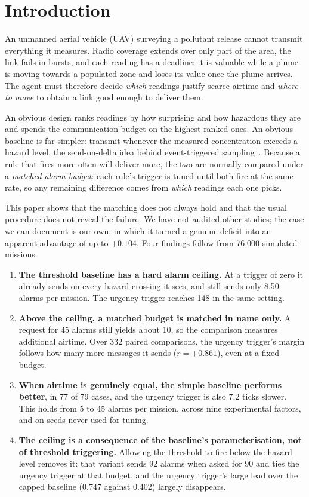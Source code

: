 \documentclass[pdflatex,sn-mathphys-num,iicol]{sn-jnl}
\theoremstyle{thmstyleone}
\theoremstyle{thmstyletwo}
\theoremstyle{thmstylethree}
\begin{document}
\section{Introduction}\label{sec:intro}

An unmanned aerial vehicle (UAV) surveying a pollutant release cannot transmit everything
it measures. Radio coverage extends over only part of the area, the link fails in bursts,
and each reading has a deadline: it is valuable while a plume is moving towards a populated
zone and loses its value once the plume arrives. The agent must therefore decide
\emph{which} readings justify scarce airtime and \emph{where to move} to obtain a link good
enough to deliver them.

An obvious design ranks readings by how surprising and how hazardous they are and spends
the communication budget on the highest-ranked ones. An obvious baseline is far simpler:
transmit whenever the measured concentration exceeds a hazard level, the send-on-delta idea behind
event-triggered sampling~\cite{miskowiczSendOnDelta2006,
hakandurakEfficientEventBasedSampling2026}. Because a rule that fires more often will
deliver more, the two are normally compared under a \emph{matched alarm budget}: each
rule's trigger is tuned until both fire at the same rate, so any remaining difference
comes from \emph{which} readings each one picks.

This paper shows that the matching does not always hold and that the usual procedure does
not reveal the failure. We have not audited other studies; the case we can document is our
own, in which it turned a genuine deficit into an apparent advantage of up to $+0.104$.
Four findings follow from 76{,}000 simulated missions.

\begin{enumerate}
\item \textbf{The threshold baseline has a hard alarm ceiling.} At a trigger of zero it
already sends on every hazard crossing it sees, and still sends only 8.50 alarms per
mission. The urgency trigger reaches 148 in the same setting.
\item \textbf{Above the ceiling, a matched budget is matched in name only.} A request for
45 alarms still yields about 10, so the comparison measures additional airtime.
Over 332 paired comparisons, the urgency trigger's margin follows how many more
messages it sends ($r = +0.861$), even at a fixed budget.
\item \textbf{When airtime is genuinely equal, the simple baseline performs better}, in 77 of 79 cases,
and the urgency trigger is also 7.2 ticks slower. This holds from 5 to 45 alarms per
mission, across nine experimental factors, and on seeds never used for tuning.
\item \textbf{The ceiling is a consequence of the baseline's parameterisation, not of
threshold triggering.} Allowing the threshold to fire below the hazard level removes it:
that variant sends 92 alarms when asked for 90 and ties the urgency trigger at that budget,
and the urgency trigger's large lead over the capped baseline (0.747 against 0.402) largely
disappears.
\end{enumerate}
\end{document}
